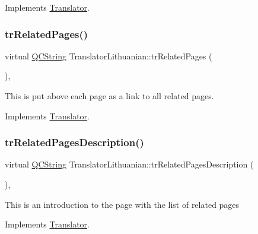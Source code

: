 Implements \mbox{\hyperlink{class_translator}{Translator}}.

\mbox{\label{class_translator_lithuanian_a492c2b7d03ddc8eb06907b77aee59813}} 
\subsubsection{\texorpdfstring{trRelatedPages()}{trRelatedPages()}}
{\footnotesize\ttfamily virtual \mbox{\hyperlink{class_q_c_string}{Q\+C\+String}} Translator\+Lithuanian\+::tr\+Related\+Pages (\begin{DoxyParamCaption}{ }\end{DoxyParamCaption})\hspace{0.3cm}{\ttfamily [inline]}, {\ttfamily [virtual]}}

This is put above each page as a link to all related pages. 

Implements \mbox{\hyperlink{class_translator}{Translator}}.

\mbox{\label{class_translator_lithuanian_a573c117288ab6ece2f219d25a7426b46}} 
\subsubsection{\texorpdfstring{trRelatedPagesDescription()}{trRelatedPagesDescription()}}
{\footnotesize\ttfamily virtual \mbox{\hyperlink{class_q_c_string}{Q\+C\+String}} Translator\+Lithuanian\+::tr\+Related\+Pages\+Description (\begin{DoxyParamCaption}{ }\end{DoxyParamCaption})\hspace{0.3cm}{\ttfamily [inline]}, {\ttfamily [virtual]}}

This is an introduction to the page with the list of related pages 

Implements \mbox{\hyperlink{class_translator}{Translator}}.

\mbox{\label{class_translator_lithuanian_a7431aab514f98d583357c45822060b41}} 
